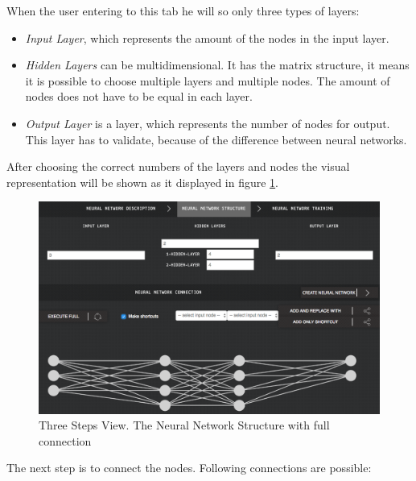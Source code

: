 When the user entering to this tab he will so only three types of layers: 
\begin{itemize}
\item \emph{Input Layer}, which represents the amount of the nodes in the input layer.
\item \emph{Hidden Layers} can be multidimensional. It has the matrix structure, it means it is possible to choose multiple layers and multiple nodes. The amount of nodes does not have to be equal in each layer.
\item \emph{Output Layer} is a layer, which represents the number of nodes for output. This layer has to validate, because of the difference between neural networks. 
\end{itemize}

After choosing the correct numbers of the layers and nodes the visual representation will be shown as it displayed in figure \ref{fig:nn_structure_3_steps}.


\begin{figure}[htbp]
\begin{center}
  \includegraphics[width=\linewidth]{components/5/img/nn_structure_3_steps.png}
  \caption{Three Steps View. The Neural Network Structure with full connection}
  \label{fig:nn_structure_3_steps}
\end{center}
\end{figure}

The next step is to connect the nodes. Following connections are possible:

